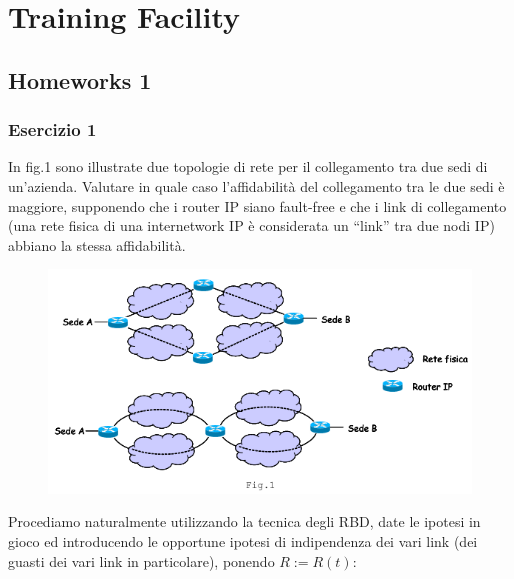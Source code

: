 
\chapter{Training Facility}
\label{cap:training}

\section{Homeworks 1}

\subsection{Esercizio 1}

In fig.1 sono illustrate due topologie di rete per il collegamento tra due sedi di un’azienda. Valutare in quale caso l’affidabilità del collegamento tra le due sedi è maggiore, supponendo che i router IP siano fault-free e che i link di collegamento (una rete fisica di una internetwork IP è considerata un “link” tra due nodi IP) abbiano la stessa affidabilità.

\begin{center}
\begin{figure}[H]
\centering
\includegraphics[scale=1]{figures/ex/hw11.png}
\end{figure}
\end{center}

Procediamo naturalmente utilizzando la tecnica degli RBD, date le ipotesi in gioco ed introducendo le opportune ipotesi di indipendenza dei vari link (dei guasti dei vari link in particolare), ponendo $R:=R(t)$:

